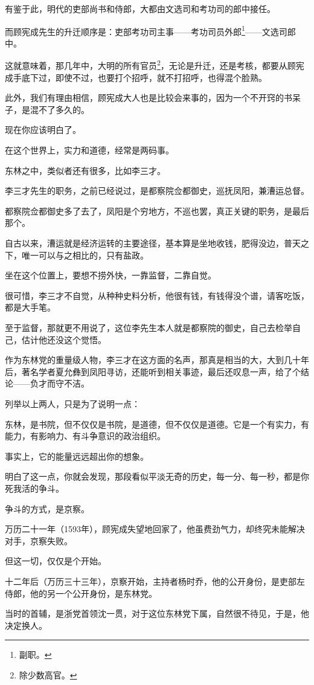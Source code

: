 \begin{multicols}{\theparacolNo}
有鉴于此，明代的吏部尚书和侍郎，大都由文选司和考功司的郎中接任。

而顾宪成先生的升迁顺序是：吏部考功司主事——考功司员外郎\footnote{副职。}——文选司郎中。

这就意味着，那几年中，大明的所有官员\footnote{除少数高官。}，无论是升迁，还是考核，都要从顾宪成手底下过，即使不过，也要打个招呼，就不打招呼，也得混个脸熟。

此外，我们有理由相信，顾宪成大人也是比较会来事的，因为一个不开窍的书呆子，是混不了多久的。

现在你应该明白了。

在这个世界上，实力和道德，经常是两码事。

东林之中，类似者还有很多，比如李三才。

李三才先生的职务，之前已经说过，是都察院佥都御史，巡抚凤阳，兼漕运总督。

都察院佥都御史多了去了，凤阳是个穷地方，不巡也罢，真正关键的职务，是最后那个。

自古以来，漕运就是经济运转的主要途径，基本算是坐地收钱，肥得没边，普天之下，唯一可以与之相比的，只有盐政。

坐在这个位置上，要想不捞外快，一靠监督，二靠自觉。

很可惜，李三才不自觉，从种种史料分析，他很有钱，有钱得没个谱，请客吃饭，都是大手笔。

至于监督，那就更不用说了，这位李先生本人就是都察院的御史，自己去检举自己，估计他还没这个觉悟。

作为东林党的重量级人物，李三才在这方面的名声，那真是相当的大，大到几十年后，著名学者夏允彝到凤阳寻访，还能听到相关事迹，最后还叹息一声，给了个结论——负才而守不洁。

列举以上两人，只是为了说明一点：

东林，是书院，但不仅仅是书院，是道德，但不仅仅是道德。它是一个有实力，有能力，有影响力、有斗争意识的政治组织。

事实上，它的能量远远超出你的想象。

明白了这一点，你就会发现，那段看似平淡无奇的历史，每一分、每一秒，都是你死我活的争斗。

争斗的方式，是京察。

万历二十一年（1593年），顾宪成失望地回家了，他虽费劲气力，却终究未能解决对手，京察失败。

但这一切，仅仅是个开始。

十二年后（万历三十三年），京察开始，主持者杨时乔，他的公开身份，是吏部左侍郎，他的另一个公开身份，是东林党。

当时的首辅，是浙党首领沈一贯，对于这位东林党下属，自然很不待见，于是，他决定换人。


\end{multicols}
